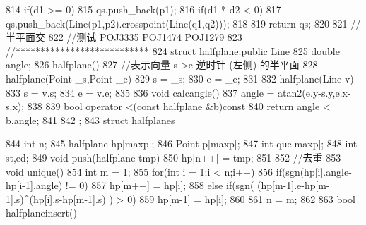 \documentclass[11pt]{article}
\begin{document}
\begin{Code}
{{814              if(d1 >= 0)
815                  qs.push_back(p1);
816              if(d1 * d2 < 0)
817                  qs.push_back(Line(p1,p2).crosspoint(Line(q1,q2)));
818       }
819       return qs;
820   }
821   //半平面交
822   //测试 POJ3335 POJ1474 POJ1279
823   //***************************
824   struct halfplane:public Line{
825       double angle;
826       halfplane(){}
827       //表示向量 s->e 逆时针 (左侧) 的半平面
828       halfplane(Point _s,Point _e){
829           s = _s;
830           e = _e;
831       }
832       halfplane(Line v){
833           s = v.s;
834           e = v.e;
835       }
836       void calcangle(){
837           angle = atan2(e.y-s.y,e.x-s.x);
838       }
839       bool operator <(const halfplane &b)const{
840           return angle < b.angle;
841       }
842   };
843   struct halfplanes{
844       int n;
845       halfplane hp[maxp];
846       Point p[maxp];
847       int que[maxp];
848       int st,ed;
849       void push(halfplane tmp){
850           hp[n++] = tmp;
851       }
852       //去重
853       void unique(){
854           int m = 1;
855           for(int i = 1;i < n;i++){
856               if(sgn(hp[i].angle-hp[i-1].angle) != 0)
857                    hp[m++] = hp[i];
858               else if(sgn( (hp[m-1].e-hp[m-1].s)^(hp[i].s-hp[m-1].s)
                     ) > 0)
859                    hp[m-1] = hp[i];
860           }
861           n = m;
862       }
863       bool halfplaneinsert(){


}}
\end{Code}
\end{document}

